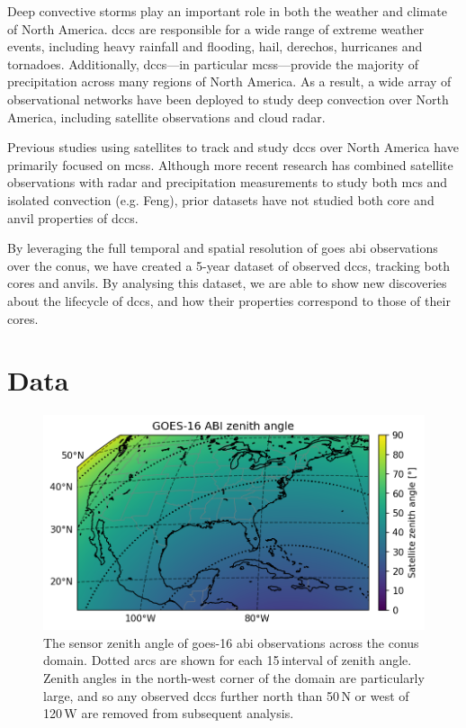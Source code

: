 Deep convective storms play an important role in both the weather and climate of North America.
\acrshort{dcc}s are responsible for a wide range of extreme weather events, including heavy rainfall and flooding, hail, derechos, hurricanes and tornadoes.
Additionally, \acrshort{dcc}s---in particular \acrshort{mcs}s---provide the majority of precipitation across many regions of North America.
As a result, a wide array of observational networks have been deployed to study deep convection over North America, including satellite observations and cloud radar.

Previous studies using satellites to track and study \acrshort{dcc}s over North America have primarily focused on \acrshort{mcs}s.
Although more recent research has combined satellite observations with radar and precipitation measurements to study both \acrshort{mcs} and isolated convection (e.g. Feng), prior datasets have not studied both core and anvil properties of \acrshort{dcc}s.

By leveraging the full temporal and spatial resolution of \acrshort{goes} \acrshort{abi} observations over the \acrshort{conus}, we have created a 5-year dataset of observed \acrshort{dcc}s, tracking both cores and anvils.
By analysing this dataset, we are able to show new discoveries about the lifecycle of \acrshort{dcc}s, and how their properties correspond to those of their cores.

\section{Data}

\begin{figure}[tp]
    \centering
    \includegraphics[width=\textwidth]{figures/ch2_01.png}
    \caption[
    The sensor zenith angle of \acrshort{goes}-16 \acrshort{abi} observations across the \acrshort{conus} domain
    ]{
    The sensor zenith angle of \acrshort{goes}-16 \acrshort{abi} observations across the \acrshort{conus} domain. Dotted arcs are shown for each 15\,\textdegree interval of zenith angle. Zenith angles in the north-west corner of the domain are particularly large, and so any observed \acrshort{dcc}s further north than 50\,\textdegree N or west of 120\,\textdegree W are removed from subsequent analysis.
    }
    \label{fig:abi_zenith_angles}
\end{figure}

